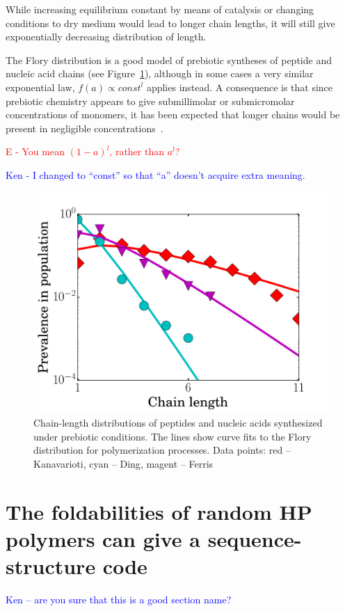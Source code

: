 \documentclass[journal=jacsat,manuscript=article,layout=twocolumn]{achemso}
\newcommand*{\red}[1]{\textcolor{red}{#1}}
\newcommand*{\blue}[1]{\textcolor{blue}{#1}}
\begin{document}
 While increasing equilibrium constant by means of catalysis or 
changing conditions to dry medium would lead to longer chain lengths, it will still give 
exponentially decreasing distribution of length\cite{Derr2012}. 

The Flory distribution is a good model of prebiotic syntheses of peptide and nucleic acid chains 
(see Figure~\ref{fig:some_flory}), although in some cases a very similar exponential law, 
$f(a)\propto const^l$ applies instead\cite{nowak2008prevolutionary,Derr2012}.  A consequence is 
that since prebiotic chemistry appears to give submillimolar or submicromolar concentrations of 
monomers, it has been expected that longer chains would be present in negligible 
concentrations~\cite{Aubrey2009,Kanavarioti2001,Lazcano1996}.

\red{E - You mean $(1-a)^l$, rather than $a^l$?}

\blue{Ken - I changed to ``const'' so that ``a'' doesn't acquire extra meaning.}

\begin{figure}[h!]
  \centering
  \includegraphics[width=\columnwidth]{pictures/some_flory.pdf} 
  \caption{Chain-length distributions of peptides and nucleic acids synthesized under prebiotic 
conditions.  The lines show curve fits to the Flory distribution for polymerization processes. Data 
points: red -- Kanavarioti\cite{Kanavarioti2001}, cyan -- Ding\cite{Ding1996}, 
magent -- Ferris\cite{Ferris1999}}
  \label{fig:some_flory}
\end{figure}




\section{The foldabilities of random HP polymers can give a sequence-structure code}
\blue{Ken -- are you sure that this is a good section name? }
\end{document}
